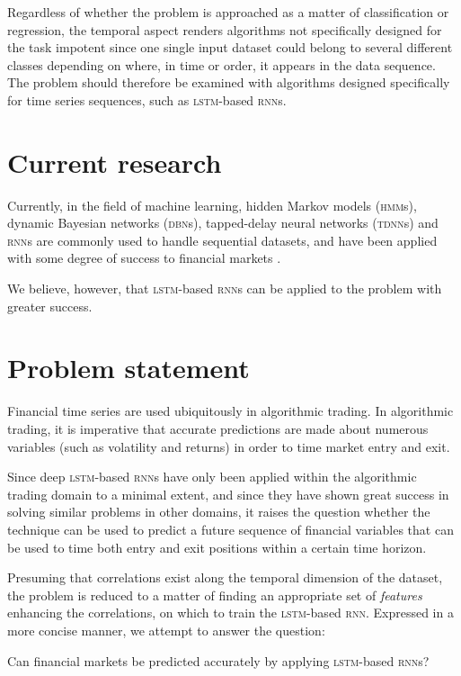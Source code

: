 Regardless of whether the problem is approached as a matter of classification or regression, the temporal aspect renders algorithms not specifically designed for the task impotent since one single input dataset could belong to several different classes depending on where, in time or order, it appears in the data sequence. The problem should therefore be examined with algorithms designed specifically for time series sequences, such as \textsc{lstm}-based \textsc{rnn}s.

\section{Current research}
Currently, in the field of machine learning, hidden Markov models (\textsc{hmm}s), dynamic Bayesian networks (\textsc{dbn}s), tapped-delay neural networks (\textsc{tdnn}s) and \textsc{rnn}s are commonly used to handle sequential datasets, and have been applied with some degree of success to financial markets \citep{saad1998,kita2012,zhang2004}.

We believe, however, that \textsc{lstm}-based \textsc{rnn}s can be applied to the problem with greater success.

\section{Problem statement}
Financial time series are used ubiquitously in algorithmic trading. In algorithmic trading, it is imperative that accurate predictions are made about numerous variables (such as volatility and returns) in order to time market entry and exit.

Since deep \textsc{lstm}-based \textsc{rnn}s have only been applied within the algorithmic trading domain to a minimal extent, and since they have shown great success in solving similar problems in other domains, it raises the question whether the technique can be used to predict a future sequence of financial variables that can be used to time both entry and exit positions within a certain time horizon.

Presuming that correlations exist along the temporal dimension of the dataset, the problem is reduced to a matter of finding an appropriate set of \textit{features} enhancing the correlations, on which to train the \textsc{lstm}-based \textsc{rnn}. Expressed in a more concise manner, we attempt to answer the question:

Can financial markets be predicted accurately by applying \textsc{lstm}-based \textsc{rnn}s?
